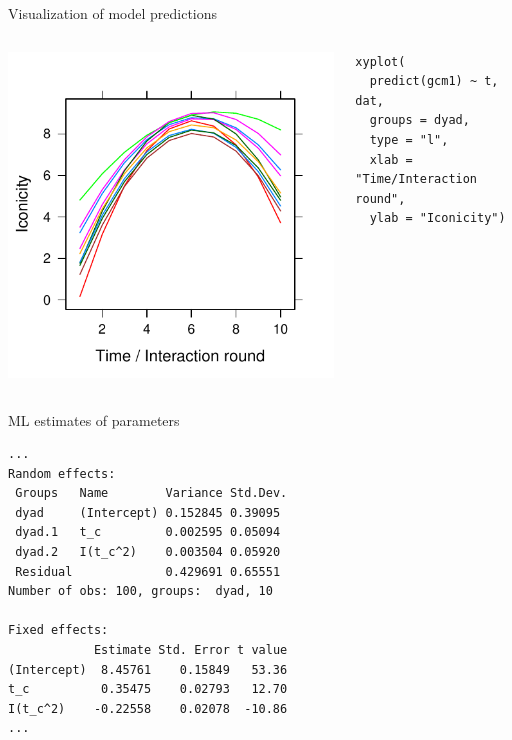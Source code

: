 \documentclass[aspectratio=169]{beamer}
\begin{document}
\begin{frame}[fragile]{Visualization of model predictions}
  \begin{columns}
    \begin{column}{.5\textwidth}
      \includegraphics[scale=.8]{../figures/icon-pre}
    \end{column}
    \begin{column}{.5\textwidth}
      \begin{lstlisting}
xyplot(
  predict(gcm1) ~ t, dat,
  groups = dyad,
  type = "l",
  xlab = "Time/Interaction round",
  ylab = "Iconicity")
      \end{lstlisting}
    \end{column}
  \end{columns}
\end{frame}

\begin{frame}[fragile]{ML estimates of parameters}
\begin{lstlisting}
...
Random effects:
 Groups   Name        Variance Std.Dev.
 dyad     (Intercept) 0.152845 0.39095 
 dyad.1   t_c         0.002595 0.05094 
 dyad.2   I(t_c^2)    0.003504 0.05920 
 Residual             0.429691 0.65551 
Number of obs: 100, groups:  dyad, 10

Fixed effects:
            Estimate Std. Error t value
(Intercept)  8.45761    0.15849   53.36
t_c          0.35475    0.02793   12.70
I(t_c^2)    -0.22558    0.02078  -10.86
...
\end{lstlisting}
\end{frame}
\end{document}
